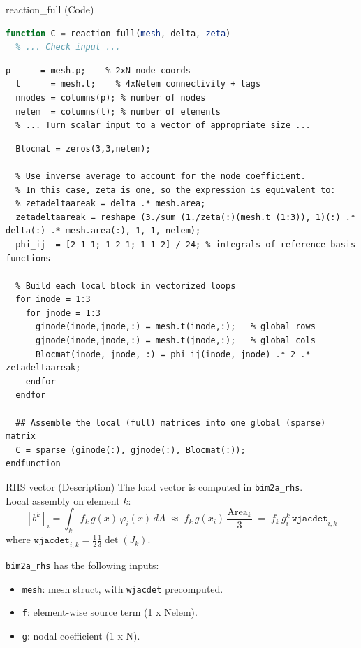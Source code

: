 \documentclass[aspectratio=54,xcolor=dvipsnames]{beamer}
\begin{document}
\begin{frame}[fragile]{reaction\_full (Code)}
\scriptsize
\begin{lstlisting}[language=Octave,firstnumber=19]
function C = reaction_full(mesh, delta, zeta)
  % ... Check input ...
\end{lstlisting}
\begin{lstlisting}[firstnumber=29]
  p      = mesh.p;    % 2xN node coords
  t      = mesh.t;    % 4xNelem connectivity + tags
  nnodes = columns(p); % number of nodes
  nelem  = columns(t); % number of elements
  % ... Turn scalar input to a vector of appropriate size ...
\end{lstlisting}
\begin{lstlisting}[firstnumber=46]
  % Local element matrices: one 3x3 block per element
  Blocmat = zeros(3,3,nelem);

  % Use inverse average to account for the node coefficient.
  % In this case, zeta is one, so the expression is equivalent to:
  % zetadeltaareak = delta .* mesh.area;
  zetadeltaareak = reshape (3./sum (1./zeta(:)(mesh.t (1:3)), 1)(:) .* delta(:) .* mesh.area(:), 1, 1, nelem);
  phi_ij  = [2 1 1; 1 2 1; 1 1 2] / 24; % integrals of reference basis functions

  % Build each local block in vectorized loops
  for inode = 1:3
    for jnode = 1:3
      ginode(inode,jnode,:) = mesh.t(inode,:);   % global rows
      gjnode(inode,jnode,:) = mesh.t(jnode,:);   % global cols
      Blocmat(inode, jnode, :) = phi_ij(inode, jnode) .* 2 .* zetadeltaareak;
    endfor
  endfor

  ## Assemble the local (full) matrices into one global (sparse) matrix
  C = sparse (ginode(:), gjnode(:), Blocmat(:));
endfunction
\end{lstlisting}
\end{frame}

\begin{frame}{RHS vector (Description)}
    The load vector is computed in \texttt{bim2a\_rhs}. \\
    Local assembly on element \(k\):
    \[
      [b^{k}]_{i}
      = \int_{k} f_{k}\,g(x)\,\varphi_i(x)\,dA
      \;\approx\;
      f_{k}\,g(x_{i})\,\frac{\mathrm{Area}_{k}}{3}
      \;=\;
      f_{k}\,g_{i}^{k}\,\texttt{wjacdet}_{i,k}
    \]
    where \(\texttt{wjacdet}_{i,k}=\tfrac12\tfrac13\det(J_k)\).  
    \bigskip

    \texttt{bim2a\_rhs} has the following inputs:
    \begin{itemize}
      \item \texttt{mesh}: mesh struct, with \texttt{wjacdet} precomputed.
      \item \texttt{f}: element-wise source term (1 x Nelem).
      \item \texttt{g}: nodal coefficient (1 x N).
    \end{itemize}
\end{frame}
\end{document}
